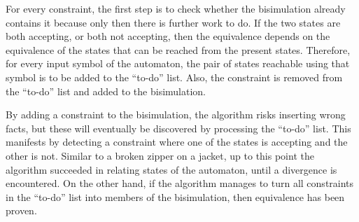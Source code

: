 For every constraint, the first step is to check whether the bisimulation already contains it
because only then there is further work to do.
If the two states are both accepting, or both not accepting, then
the equivalence depends on the equivalence of the states that can be reached from the present states.
Therefore, for every input symbol of the automaton, the pair of states reachable using that symbol
is to be added to the ``to-do'' list.
Also, the constraint is removed from the ``to-do'' list and added to the bisimulation.

By adding a constraint to the bisimulation, the algorithm risks inserting wrong facts,
but these will eventually be discovered by processing the ``to-do'' list.
This manifests by detecting a constraint where one of the states is accepting and the other is not.
Similar to a broken zipper on a jacket, up to this point the algorithm succeeded in
relating states of the automaton, until a divergence is encountered.
On the other hand, if the algorithm manages to turn all constraints in the ``to-do'' list
into members of the bisimulation, then equivalence has been proven.


